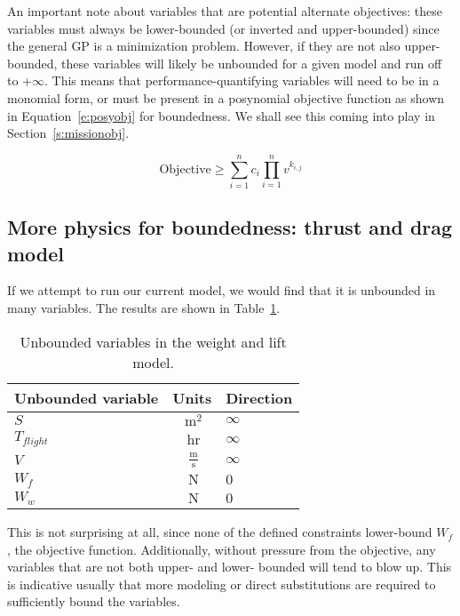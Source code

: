 An important note about variables that are potential alternate objectives: these variables
must always be lower-bounded (or inverted and upper-bounded) since the general \gls{GP} is a
minimization problem. However, if they are not also upper-bounded, these variables
will likely be unbounded for a given model and run off to +$\infty$. This means that
performance-quantifying variables will need to be in a monomial form,
or must be present in a posynomial objective
function as shown in Equation~\ref{e:posyobj} for boundedness. We shall see this coming into play
in Section~\ref{s:missionobj}.

\begin{equation}
    \mathrm{Objective} \geq \sum\limits^n_{i=1}c_{i}\prod\limits^n_{i=1}  v^{k_{i,j}}
    \label{e:posyobj}
\end{equation}

\subsection{More physics for boundedness: thrust and drag model}
\label{s:td}

If we attempt to run our current model, we would find that it is unbounded in many variables.
The results are shown in Table~\ref{t:WandL_unbounded}.

\begin{footnotesize}
\begin{table}[H]
    \begin{center}
    \begin{tabular}{ l c l }
        \toprule
        Unbounded variable & Units & Direction \\
        \midrule
        $S$ & $~\mathrm{m^{2}}$ & $\infty$ \\
        $T_{flight}$ & $~\mathrm{hr}$ & $\infty$ \\
        $V$ &  $~\mathrm{\tfrac{m}{s}}$  & $\infty$ \\
        $W_f$ & $~\mathrm{N}$ & $0$ \\
        $W_w$ & $~\mathrm{N}$  & $0$ \\
        \bottomrule
    \end{tabular}
    \end{center}
    \caption{Unbounded variables in the weight and lift model.}
    \label{t:WandL_unbounded}
\end{table} \end{footnotesize}

This is not surprising at all, since none of the defined constraints lower-bound $W_f$,
the objective function.
Additionally, without pressure from the objective, any variables that
are not both upper- and lower- bounded will tend to blow up. This is indicative usually
that more modeling or direct substitutions are required to sufficiently bound the variables.

